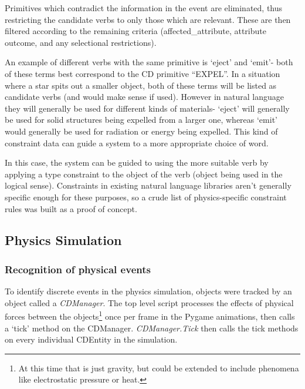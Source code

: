 \documentclass[dissertation.tex]{subfiles}
\begin{document}
    Primitives which contradict the information in the event are eliminated, thus restricting the candidate verbs to only those which are relevant. These are then filtered according to the remaining criteria (affected\_attribute, attribute outcome, and any selectional restrictions).

    An example of different verbs with the same primitive is `eject' and `emit'- both of these terms best correspond to the CD primitive ``EXPEL''. In a situation where a star spits out a smaller object, both of these terms will be listed as candidate verbs (and would make sense if used). However in natural language they will generally be used for different kinds of materials- `eject' will generally be used for solid structures being expelled from a larger one, whereas `emit' would generally be used for radiation or energy being expelled. This kind of constraint data can guide a system to a more appropriate choice of word.

    In this case, the system can be guided to using the more suitable verb by applying a type constraint to the object of the verb (object being used in the logical sense). Constraints in existing natural language libraries aren't generally specific enough for these purposes, so a crude list of physics-specific constraint rules was built as a proof of concept.

    \subsection{Physics Simulation}
    \subsubsection{Recognition of physical events}
    To identify discrete events in the physics simulation, objects were tracked by an object called a \textit{CDManager}. The top level script processes the effects of physical forces between the objects\footnote{At this time that is just gravity, but could be extended to include phenomena like electrostatic pressure or heat.} once per frame in the Pygame animations, then calls a `tick' method on the CDManager. \textit{CDManager.Tick} then calls the tick methods on every individual CDEntity in the simulation.

\lstset{language=Python,basicstyle=\footnotesize,}
\end{document}
